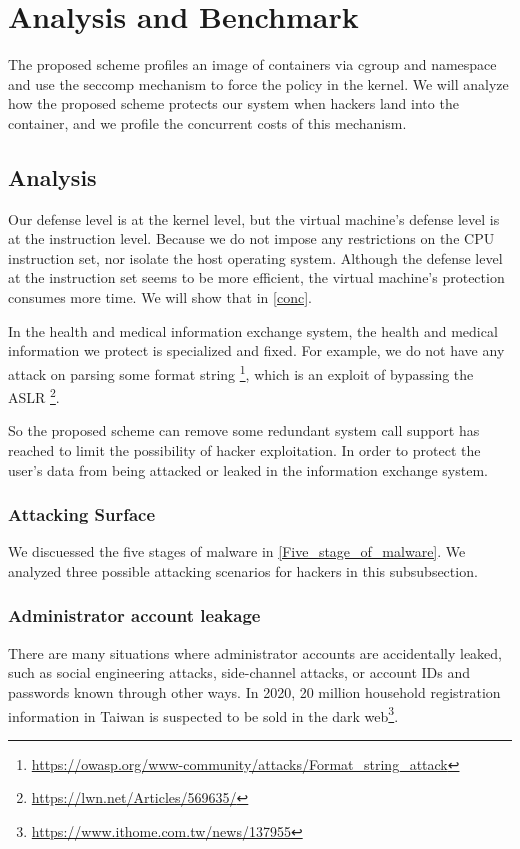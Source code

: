 \section{Analysis and Benchmark}

The proposed scheme profiles an image of containers via cgroup and namespace
and use the seccomp mechanism to force the policy in the kernel.
We will analyze how the proposed scheme protects our system when hackers land
into the container, and we profile the concurrent costs of this
mechanism.

\subsection{Analysis}
Our defense level is at the kernel level, but the virtual machine's
defense level is at the instruction level. Because we do not impose any
restrictions on the CPU instruction set, nor isolate the host operating system.
Although the defense level at the instruction set seems to be more efficient,
the virtual machine's protection consumes more time. We will show that in \ref{conc}.

In the health and medical information exchange system, the health and
medical information we protect is specialized and fixed. For example,
we do not have any attack on parsing some format string
\footnote{\url{https://owasp.org/www-community/attacks/Format_string_attack}},
which is an exploit of bypassing the ASLR \footnote{\url{https://lwn.net/Articles/569635/}}.

So the proposed scheme can remove some redundant system call support has reached to
limit the possibility of hacker exploitation. In order to protect
the user's data from being attacked or leaked in the information exchange system.

\subsubsection{Attacking Surface}
We discuessed the five stages of malware in \ref{Five_stage_of_malware}. We analyzed
three possible attacking scenarios for hackers in this subsubsection.

\subsubsection{Administrator account leakage}
There are many situations where administrator accounts are accidentally
leaked, such as social engineering attacks, side-channel attacks,
or account IDs and passwords known through other ways.
In 2020, 20 million household registration information in Taiwan is
suspected to be sold in the dark web\footnote{\url{https://www.ithome.com.tw/news/137955}}.

